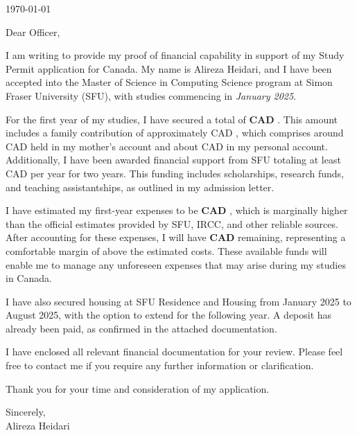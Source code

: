 \thispagestyle{plain}

\today\\

\coverLetterRecipient

Dear Officer,

I am writing to provide my proof of financial capability in support of my Study Permit application for Canada. My name is Alireza Heidari, and I have been accepted into the Master of Science in Computing Science program at Simon Fraser University (SFU), with studies commencing in \textit{January 2025}.

For the first year of my studies, I have secured a total of \textbf{CAD {\totalFunds}}. This amount includes a family contribution of approximately CAD {\sponsorFunds}, which comprises around CAD {\sponsorFunds} held in my mother's account and about CAD {\selfFunds} in my personal account. Additionally, I have been awarded financial support from SFU totaling at least CAD {\universityFunds} per year for two years. This funding includes scholarships, research funds, and teaching assistantships, as outlined in my admission letter. 

I have estimated my first-year expenses to be \textbf{CAD {\totalExpenses}}, which is marginally higher than the official estimates provided by SFU, IRCC, and other reliable sources. After accounting for these expenses, I will have \textbf{CAD {\remainingFunds}} remaining, representing a comfortable margin of \textbf{{\remainingFundsToExpensesPercentage}} above the estimated costs. These available funds will enable me to manage any unforeseen expenses that may arise during my studies in Canada.

I have also secured housing at SFU Residence and Housing from January 2025 to August 2025, with the option to extend for the following year. A deposit has already been paid, as confirmed in the attached documentation.

I have enclosed all relevant financial documentation for your review. Please feel free to contact me if you require any further information or clarification.

Thank you for your time and consideration of my application.

\noindent
Sincerely,\\
Alireza Heidari

\clearpage
